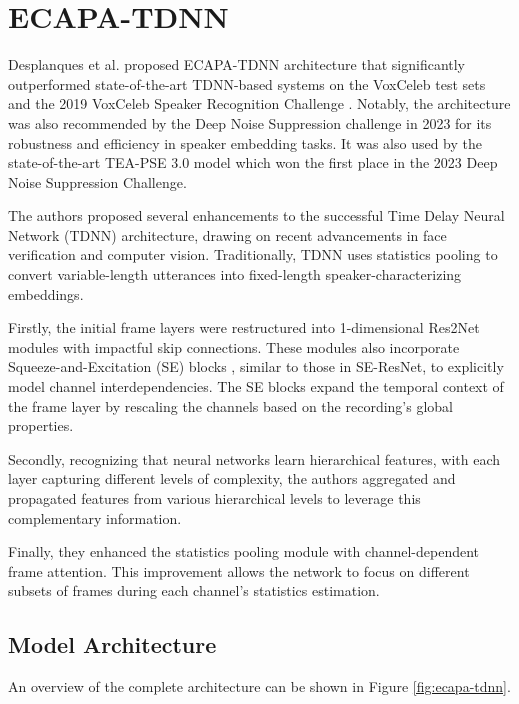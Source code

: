 \section{ECAPA-TDNN}
Desplanques et al. \cite{desplanques2020} proposed ECAPA-TDNN architecture that significantly outperformed state-of-the-art TDNN-based systems on the VoxCeleb test sets and the 2019 VoxCeleb Speaker Recognition Challenge \cite{chung2019voxsrc2019voxcelebspeaker}. Notably, the architecture was also recommended by the Deep Noise Suppression challenge in 2023 \cite{dubey2023} for its robustness and efficiency in speaker embedding tasks. It was also used by the state-of-the-art TEA-PSE 3.0 \cite{ju2023teapse30tencentetherealaudiolabpersonalized} model which won the first place in the 2023 Deep Noise Suppression Challenge.

The authors proposed several enhancements to the successful Time Delay Neural Network (TDNN) architecture, drawing on recent advancements in face verification and computer vision. Traditionally, TDNN uses statistics pooling to convert variable-length utterances into fixed-length speaker-characterizing embeddings.

Firstly, the initial frame layers were restructured into 1-dimensional Res2Net modules \cite{Res2Net} with impactful skip connections. These modules also incorporate Squeeze-and-Excitation (SE) blocks \cite{Squeeze-and-Excitation}, similar to those in SE-ResNet, to explicitly model channel interdependencies. The SE blocks expand the temporal context of the frame layer by rescaling the channels based on the recording's global properties.

Secondly, recognizing that neural networks learn hierarchical features, with each layer capturing different levels of complexity, the authors aggregated and propagated features from various hierarchical levels to leverage this complementary information.

Finally, they enhanced the statistics pooling module with channel-dependent frame attention. This improvement allows the network to focus on different subsets of frames during each channel's statistics estimation.

\subsection{Model Architecture}

An overview of the complete architecture can be shown in Figure \ref{fig:ecapa-tdnn}.


